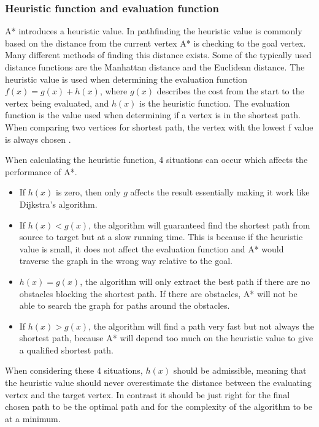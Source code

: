   \subsubsection{Heuristic function and evaluation function}
  A* introduces a heuristic value. In pathfinding the heuristic value is commonly based on the distance from the current vertex A* is checking to the goal vertex. Many different methods of finding this distance exists. Some of the typically used distance functions are the Manhattan distance and the Euclidean distance. The heuristic value is used when determining the evaluation function $f(x) = g(x) + h(x)$, where $g(x)$ describes the cost from the start to the vertex being evaluated, and $h(x)$ is the heuristic function. The evaluation function is the value used when determining if a vertex is in the shortest path. When comparing two vertices for shortest path, the vertex with the lowest f value is always chosen \cite{Patel2013}.

  When calculating the heuristic function, 4 situations can occur which affects the performance of A*.

    \begin{itemize}
    \item If $h(x)$ is zero, then only $g$ affects the result essentially making it work like Dijkstra's algorithm.

    \item If $h(x) < g(x)$, the algorithm will guaranteed find the shortest path from source to target but at a slow running time. This is because if the heuristic value is small, it does not affect the evaluation function and A* would traverse the graph in the wrong way relative to the goal.

    \item $h(x) = g(x)$, the algorithm will only extract the best path if there are no obstacles blocking the shortest path. If there are obstacles, A* will not be able to search the graph for paths around the obstacles.

    \item If $h(x) > g(x)$, the algorithm will find a path very fast but not always the shortest path, because A* will depend too much on the heuristic value to give a qualified shortest path.
  \end{itemize}

  When considering these 4 situations, $h(x)$ should be admissible, meaning that the heuristic value should never overestimate the distance between the evaluating vertex and the target vertex. In contrast it should be just right for the final chosen path to be the optimal path and for the complexity of the algorithm to be at a minimum. 

